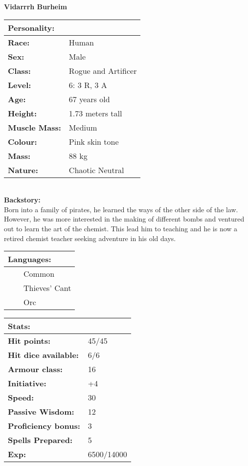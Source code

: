 \documentclass[11pt]{article}
\newcommand{\tabitem}{~~\llap{--}~~}
\begin{document}
	\begin{center}
\Huge \textbf{Vidarrrh Burheim}
	\end{center}
	\begin{multicols}{2}
\noindent \begin{tabularx}{95mm}{@{}l l}
\Large \textbf{Personality:} 	& 						\\
\hline
\textbf{Race:} 					& Human	 				\\
\textbf{Sex:} 					& Male 					\\
\textbf{Class:}					& Rogue and Artificer	\\
\textbf{Level:} 				& 6: 3 R, 3 A			\\
\textbf{Age:} 					& 67 years old			\\
\textbf{Height:} 				& 1.73 meters tall 		\\
\textbf{Muscle Mass:} 			& Medium 				\\
\textbf{Colour:} 				& Pink skin tone	 	\\
\textbf{Mass:} 					& 88 kg			 		\\
\textbf{Nature:} 				& Chaotic Neutral
		\end{tabularx} \\
\textbf{Backstory:} \\
Born into a family of pirates, he learned the ways of the other side of the law. However, he was more interested in the making of different bombs and ventured out to learn the art of the chemist. This lead him to teaching and he is now a retired chemist teacher seeking adventure in his old days.

\noindent \begin{tabularx}{95mm}{@{}l}
{\Large \textbf{Languages:}} \\
\hline
\tabitem Common \\
\tabitem Thieves' Cant \\
\tabitem Orc
		\end{tabularx}

\vspace{4mm}

\noindent \begin{tabularx}{95mm}{@{}l l}
\Large \textbf{Stats:}		 	& 									\\
\hline
\textbf{Hit points:} 			& 45/45 							\\
\textbf{Hit dice available:}	& 6/6								\\
\textbf{Armour class:} 			& 16							 	\\
\textbf{Initiative:} 			& +4								\\
\textbf{Speed:} 				& 30		 						\\
\textbf{Passive Wisdom:} 		& 12	 							\\
\textbf{Proficiency bonus:}		& 3									\\
\textbf{Spells Prepared:} 		& 5									\\
\textbf{Exp:} 					& 6500/14000
		\end{tabularx}


\end{multicols}
\end{document}
